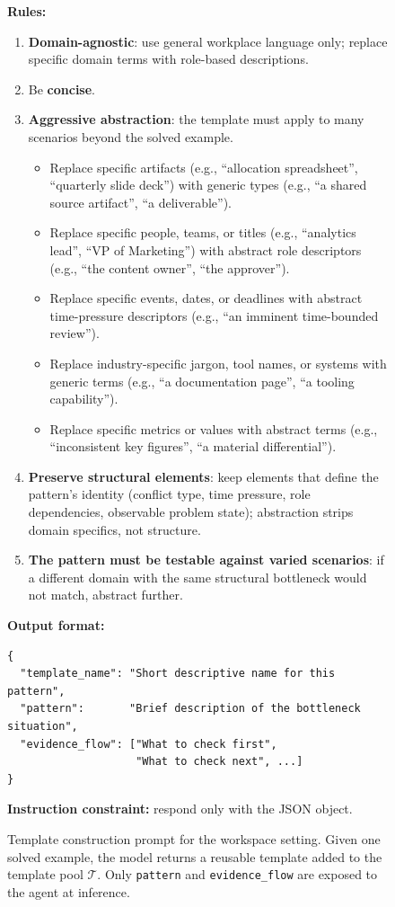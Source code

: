 \documentclass{llmxive}
\begin{document}
\begin{figure}[!t]
\begin{tcolorbox}[colback=gray!5, colframe=gray!50,
                  boxrule=0.5pt, arc=2mm,
                  left=4pt, right=4pt, top=3pt, bottom=3pt]
\medskip
\textbf{Rules:}
\begin{enumerate}[topsep=0pt, itemsep=0ex, parsep=0pt, left=14pt]
  \item \textbf{Domain-agnostic}: use general workplace language only; replace specific domain terms with role-based descriptions.
  \item Be \textbf{concise}.
  \item \textbf{Aggressive abstraction}: the template must apply to many scenarios beyond the solved example.
  \begin{itemize}[topsep=0pt, itemsep=0ex, parsep=0pt, left=12pt]
     \item Replace specific artifacts (e.g., ``allocation spreadsheet'', ``quarterly slide deck'') with generic types (e.g., ``a shared source artifact'', ``a deliverable'').
     \item Replace specific people, teams, or titles (e.g., ``analytics lead'', ``VP of Marketing'') with abstract role descriptors (e.g., ``the content owner'', ``the approver'').
     \item Replace specific events, dates, or deadlines with abstract time-pressure descriptors (e.g., ``an imminent time-bounded review'').
     \item Replace industry-specific jargon, tool names, or systems with generic terms (e.g., ``a documentation page'', ``a tooling capability'').
     \item Replace specific metrics or values with abstract terms (e.g., ``inconsistent key figures'', ``a material differential'').
  \end{itemize}
  \item \textbf{Preserve structural elements}: keep elements that define the pattern's identity (conflict type, time pressure, role dependencies, observable problem state); abstraction strips domain specifics, not structure.
  \item \textbf{The pattern must be testable against varied scenarios}: if a different domain with the same structural bottleneck would not match, abstract further.
\end{enumerate}

\medskip
\textbf{Output format:}
\begin{verbatim}
{
  "template_name": "Short descriptive name for this pattern",
  "pattern":       "Brief description of the bottleneck situation",
  "evidence_flow": ["What to check first",
                    "What to check next", ...]
}
\end{verbatim}

\textbf{Instruction constraint:} respond only with the JSON object.
\end{tcolorbox}
\caption{Template construction prompt for the workspace setting. Given one solved example, the model returns a reusable template added to the template pool $\mathcal{T}$. Only \texttt{pattern} and \texttt{evidence\_flow} are exposed to the agent at inference.}
\label{fig:prompt_template_construction_workspace}
\end{figure}
\end{document}
